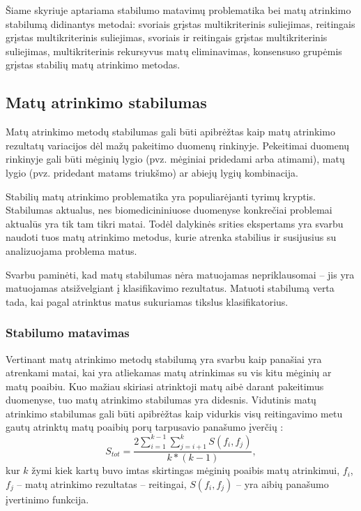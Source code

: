 Šiame skyriuje aptariama stabilumo matavimų problematika bei matų atrinkimo stabilumą didinantys metodai: svoriais grįstas multikriterinis suliejimas, reitingais grįstas multikriterinis suliejimas, svoriais ir reitingais grįstas multikriterinis suliejimas, multikriterinis rekursyvus matų eliminavimas, konsensuso grupėmis grįstas stabilių matų atrinkimo metodas.

\subsection{Matų atrinkimo stabilumas}

Matų atrinkimo metodų stabilumas gali būti apibrėžtas kaip matų atrinkimo rezultatų variacijos dėl mažų pakeitimo duomenų rinkinyje. Pekeitimai duomenų rinkinyje gali būti mėginių lygio (pvz. mėginiai pridedami arba atimami), matų lygio (pvz. pridedant matams triukšmo) ar abiejų lygių kombinacija.

Stabilių matų atrinkimo problematika yra populiarėjanti tyrimų kryptis. Stabilumas aktualus, nes biomedicininiuose duomenyse konkrečiai problemai aktualūs yra tik tam tikri matai. Todėl dalykinės srities ekspertams yra svarbu naudoti tuos matų atrinkimo metodus, kurie atrenka stabilius ir susijusius su analizuojama problema matus. 

Svarbu paminėti, kad matų stabilumas nėra matuojamas nepriklausomai -- jis yra matuojamas atsižvelgiant į klasifikavimo rezultatus. Matuoti stabilumą verta tada, kai pagal atrinktus matus sukuriamas tikslus klasifikatorius.

\subsubsection{Stabilumo matavimas}

Vertinant matų atrinkimo metodų stabilumą yra svarbu kaip panašiai yra atrenkami matai, kai yra atliekamas matų atrinkimas su vis kitu mėginių ar matų poaibiu. Kuo mažiau skiriasi atrinktoji matų aibė darant pakeitimus duomenyse, tuo matų atrinkimo stabilumas yra didesnis. Vidutinis matų atrinkimo stabilumas gali būti apibrėžtas kaip vidurkis visų reitingavimo metu gautų atrinktų matų poaibių porų tarpusavio panašumo įverčių \cite{kalousis2007stability}:
\begin{equation}
 S_{tot}=\frac{2\sum_{i=1}^{k-1}\sum_{j=i+1}^{k} S(f_i, f_j)}{k*(k-1)},
\end{equation} 
kur $k$ žymi kiek kartų buvo imtas skirtingas mėginių poaibis matų atrinkimui,
$f_i$, $f_j$ -- matų atrinkimo rezultatas -- reitingai, 
$S(f_i, f_j)$ -- yra aibių panašumo įvertinimo funkcija.

